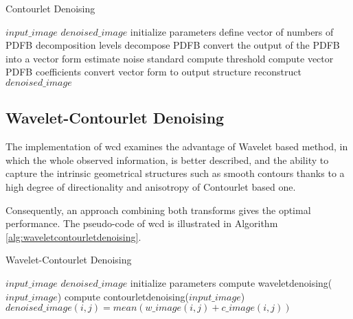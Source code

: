 \begin{algorithm}[h]
	\caption{Contourlet Denoising}\label{alg:contourletdenoising}
	\begin{algorithmic}[1]
		\Require $input\_image$
		\Ensure $denoised\_image$
		\State initialize parameters
		\State define vector of numbers of PDFB decomposition levels  
		\State decompose PDFB 
		\State convert the output of the PDFB into a vector form 
		\State estimate noise standard 
		\State compute threshold 
		\State compute vector PDFB coefficients  
		\State convert vector form to output structure 
		\State reconstruct $denoised\_image$ 
		\EndProcedure
	\end{algorithmic}
\end{algorithm}


\subsection{Wavelet-Contourlet Denoising}

The implementation of \gls{wcd} examines the advantage of Wavelet based method, in which the whole observed information, is better described, and the ability to capture the intrinsic geometrical structures such as smooth
contours thanks to a high degree of directionality and
anisotropy of Contourlet based one.

Consequently, an approach combining both transforms gives the optimal performance. The pseudo-code of \gls{wcd} is illustrated in Algorithm \ref{alg:waveletcontourletdenoising}.

\begin{algorithm}[h]
	\caption{Wavelet-Contourlet Denoising}\label{alg:waveletcontourletdenoising}
	\begin{algorithmic}[1]
		\Require $input\_image$
		\Ensure $denoised\_image$
		\State initialize parameters
		\State compute waveletdenoising($input\_image$) 
		\State compute contourletdenoising($input\_image$) 
		\State $denoised\_image(i,j) =  mean(w\_image(i,j)+c\_image(i,j))$
		\EndFor
		\EndProcedure
	\end{algorithmic}
\end{algorithm}


